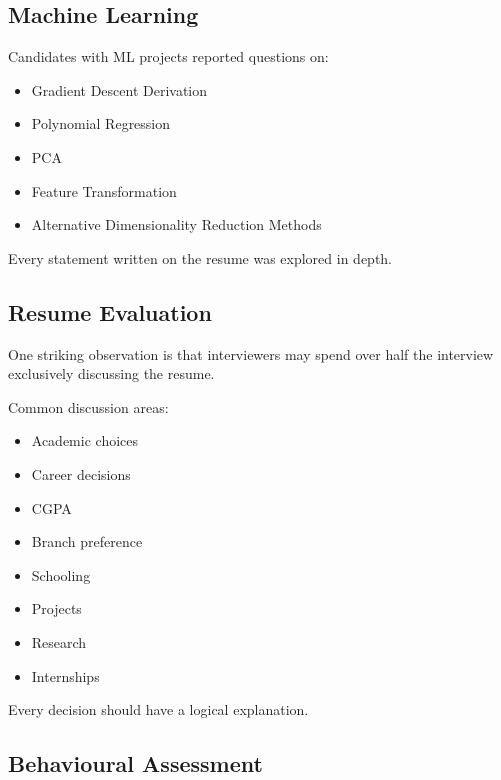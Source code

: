 \documentclass[11pt,a4paper]{article}
\begin{document}

\subsection{Machine Learning}

Candidates with ML projects reported questions on:

\begin{itemize}
	\item Gradient Descent Derivation
	\item Polynomial Regression
	\item PCA
	\item Feature Transformation
	\item Alternative Dimensionality Reduction Methods
\end{itemize}

Every statement written on the resume was explored in depth.


\subsection{Resume Evaluation}

One striking observation is that interviewers may spend over half the interview exclusively discussing the resume.

Common discussion areas:

\begin{itemize}
	\item Academic choices
	\item Career decisions
	\item CGPA
	\item Branch preference
	\item Schooling
	\item Projects
	\item Research
	\item Internships
\end{itemize}

Every decision should have a logical explanation.


\subsection{Behavioural Assessment}
\end{document}
